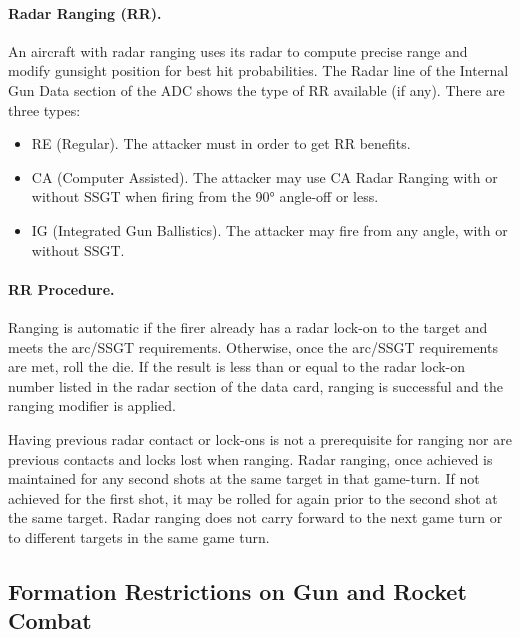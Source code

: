 \paragraph{Radar Ranging (RR).} An aircraft with radar ranging uses its radar to compute precise range and modify gunsight position for best hit probabilities. The Radar line of the Internal Gun Data section of the ADC shows the type of RR available (if any). There are three types:

\begin{itemize}

\item RE (Regular). The attacker must  in order to get RR benefits.

\item CA (Computer Assisted). The attacker may use CA Radar Ranging with or without SSGT when firing from the 90° angle-off or less.

\item IG (Integrated Gun Ballistics). The attacker may fire from any angle, with or without SSGT.

\end{itemize}

\paragraph{RR Procedure.} Ranging is automatic if the firer already has a radar lock-on to the target and meets the arc/SSGT requirements. Otherwise, once the arc/SSGT requirements are met, roll the die. If the result is less than or equal to the radar lock-on number listed in the radar section of the data card, ranging is successful and the ranging modifier is applied.

Having previous radar contact or lock-ons is not a prerequisite for ranging nor are previous contacts and locks lost when ranging. Radar ranging, once achieved is maintained for any second shots at the same target in that game-turn. If not achieved for the first shot, it may be rolled for again prior to the second shot at the same target. Radar ranging does not carry forward to the next game turn or to different targets in the same game turn.

\subsection{Formation Restrictions on Gun and Rocket Combat}


